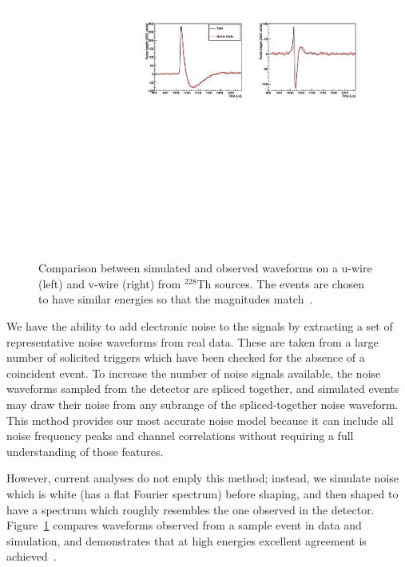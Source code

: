 \begin{figure}
\begin{center}
\includegraphics[keepaspectratio=true,width=\textwidth]{pulse_comp.pdf}
\end{center}
\renewcommand{\baselinestretch}{1}
\small\normalsize
\begin{quote}
\caption{Comparison between simulated and observed waveforms on a u-wire (left) and v-wire (right) from $^{228}$Th sources.  The events are chosen to have similar energies so that the magnitudes match~\cite{MCDocumentRun2a}.}
\label{fig:MCPulseComparison}
\end{quote}
\end{figure}
\renewcommand{\baselinestretch}{2}
\small\normalsize

We have the ability to add electronic noise to the signals by extracting a set of representative noise waveforms from real data.  These are taken from a large number of solicited triggers which have been checked for the absence of a coincident event.  To increase the number of noise signals available, the noise waveforms sampled from the detector are spliced together, and simulated events may draw their noise from any subrange of the spliced-together noise waveform.  This method provides our most accurate noise model because it can include all noise frequency peaks and channel correlations without requiring a full understanding of those features.

However, current analyses do not emply this method; instead, we simulate noise which is white (has a flat Fourier spectrum) before shaping, and then shaped to have a spectrum which roughly resembles the one observed in the detector.  Figure~\ref{fig:MCPulseComparison} compares waveforms observed from a sample event in data and simulation, and demonstrates that at high energies excellent agreement is achieved~\cite{MCDocumentRun2a}.

